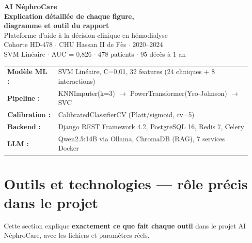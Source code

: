 \documentclass[12pt,a4paper]{article}
\begin{document}

\begin{titlepage}
\centering\vspace*{1.5cm}
{\LARGE\bfseries\color{primary}AI NéphroCare\\[0.5cm]}
{\Large\bfseries Explication détaillée de chaque figure,\\
diagramme et outil du rapport\\[0.8cm]}
{\normalsize\color{gray}
Plateforme d'aide à la décision clinique en hémodialyse\\
Cohorte HD-478 $\cdot$ CHU Hassan II de Fès $\cdot$ 2020--2024\\[0.3cm]
SVM Linéaire $\cdot$ AUC = 0{,}826 $\cdot$ 478 patients $\cdot$ 95 décès à 1 an\\[1cm]}
{\small
\begin{tabular}{ll}
\textbf{Modèle ML :} & SVM Linéaire, C=0{,}01, 32 features (24 cliniques + 8 interactions)\\
\textbf{Pipeline :} & KNNImputer(k=3) $\rightarrow$ PowerTransformer(Yeo-Johnson) $\rightarrow$ SVC\\
\textbf{Calibration :} & CalibratedClassifierCV (Platt/sigmoid, cv=5)\\
\textbf{Backend :} & Django REST Framework 4.2, PostgreSQL 16, Redis 7, Celery\\
\textbf{LLM :} & Qwen2.5:14B via Ollama, ChromaDB (RAG), 7 services Docker\\
\end{tabular}}
\vfill
\end{titlepage}

\tableofcontents\newpage

\section{Outils et technologies --- rôle précis dans le projet}

Cette section explique \textbf{exactement ce que fait chaque outil} dans le projet
AI NéphroCare, avec les fichiers et paramètres réels.
\end{document}
